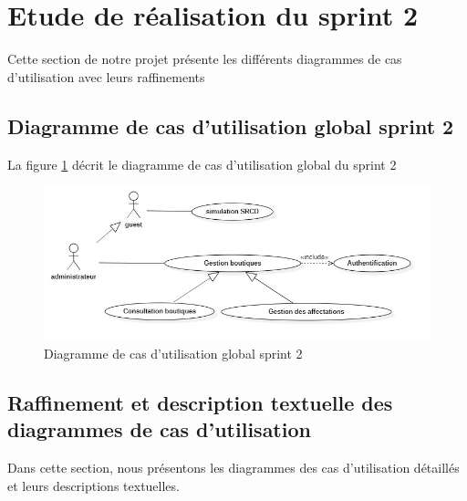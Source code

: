 \section{Etude de réalisation du sprint 2}
Cette section de notre projet présente les différents diagrammes de cas d’utilisation avec leurs raffinements
\newpage
\subsection{Diagramme de cas d’utilisation global sprint 2}
La figure \ref{fig:usecase-sprint2} décrit le diagramme de cas d’utilisation global du sprint 2
\begin{figure}[H]
	\centering
	\includegraphics[width=0.75\linewidth]{"img/conception/usecases/sprint 2/UseCase-sprint2"}
	\caption[Diagramme de cas d’utilisation global sprint 2]{Diagramme de cas d’utilisation global sprint 2}
	\label{fig:usecase-sprint2}
\end{figure}
\subsection{Raffinement et description textuelle des diagrammes de cas d’utilisation}
Dans cette section, nous présentons les diagrammes des cas d’utilisation détaillés et leurs descriptions textuelles.
